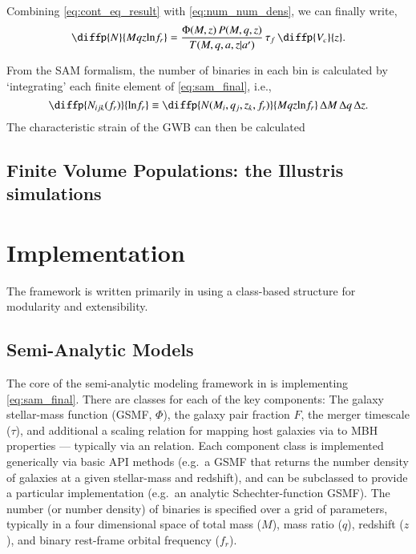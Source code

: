 \documentclass[useAMS, usenatbib]{src/mnras}
\begin{document}
        Combining \eqref{eq:cont_eq_result} with \eqref{eq:num_num_dens}, we can finally write,
        \begin{equation}
            \label{eq:sam_final}
            \diffp{N}{{M}{q}{z}{\ln\!f_r}} = \frac{\Phi(M,z) \, P(M,q,z)}{T(M,q,a,z|a')} \, \thardf \, \diffp{V_c}{z}.
        \end{equation}

        From the SAM formalism, the number of binaries in each bin is calculated by `integrating' each finite element of \eqref{eq:sam_final}, i.e.,
        \begin{equation}
            \diffp{N_{ijk}(f_r)}{{\ln\!f_r}} \equiv \diffp{N(M_i, q_j, z_k, {f_r})}{{M}{q}{z}{\ln\!f_r}} \, \Delta M \,\Delta q \, \Delta z.
        \end{equation}
        The characteristic strain of the GWB can then be calculated

    \subsection{Finite Volume Populations: the Illustris simulations}




\section{Implementation}
    \label{sec:imp}

    The \holodeck{} framework is written primarily in \python{} using a class-based structure for modularity and extensibility.

    \subsection{Semi-Analytic Models}
        \label{sec:imp_sam}

        The core of the semi-analytic modeling framework in \holodeck{} is implementing \eqref{eq:sam_final}.  There are classes for each of the key components: The galaxy stellar-mass function (GSMF, $\Phi$), the galaxy pair fraction \(F\), the merger timescale ($\tau$), and additional a scaling relation for mapping host galaxies via to MBH properties --- typically via an \mmbulge{} relation.  Each component class is implemented generically via basic API methods (e.g.~a GSMF that returns the number density of galaxies at a given stellar-mass and redshift), and can be subclassed to provide a particular implementation (e.g.~an analytic Schechter-function GSMF).  The number (or number density) of binaries is specified over a grid of parameters, typically in a four dimensional space of total mass ($M$), mass ratio ($q$), redshift ($z$), and binary rest-frame orbital frequency ($f_r$).
\end{document}
